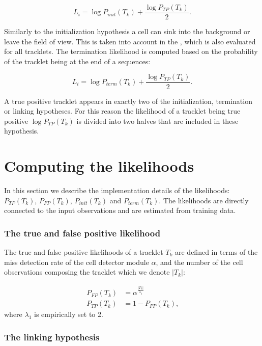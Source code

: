 		\[
			L_i = \log P_{init}(T_k) + \frac{\log P_{TP}(T_k)}{2}\text{.}
		\]
		
			
		Similarly to the initialization hypothesis a cell can sink into the background or leave the field of view. This is taken into account in the , which is also evaluated for all tracklets. The termination likelihood is computed based on the probability of the tracklet being at the end of a sequences:
		
		\[
			L_i = \log P_{term}(T_k) + \frac{\log P_{TP}(T_k)}{2}\text{.}
		\]
		
		A true positive tracklet appears in exactly two of the initialization, termination or linking hypotheses. For this reason the likelihood of a tracklet being true positive $\log P_{TP}(T_k)$ is divided into two halves that are included in these hypothesis.
       	
    \section{Computing the likelihoods}
       	\label{sec:computinglikelihoods}
       	
       	In this section we describe the implementation details of the likelihoods: $P_{TP}(T_k)$, $P_{FP}(T_k)$, $P_{init}(T_k)$ and $P_{term}(T_k)$. The likelihoods are directly connected to the input observations and are estimated from training data.     			

       	\subsubsection{The true and false positive likelihood}
       		
       		The true and false positive likelihoods of a tracklet $T_k$ are defined in terms of the miss detection rate of the cell detector module $\alpha$, and the number of the cell observations composing the tracklet which we denote $|T_k|$:
       		
       		\begin{align*}
	       		P_{FP}(T_k) &= \alpha^{\frac{|T_k|}{\lambda_1}} \\
	       		P_{TP}(T_k) &= 1 - P_{FP}(T_k) \text{,}
       		\end{align*}
			\noindent where $ \lambda_1 $ is empirically set to 2.
       		
       		
       		
     	\subsubsection{The linking hypothesis}
     	   	
